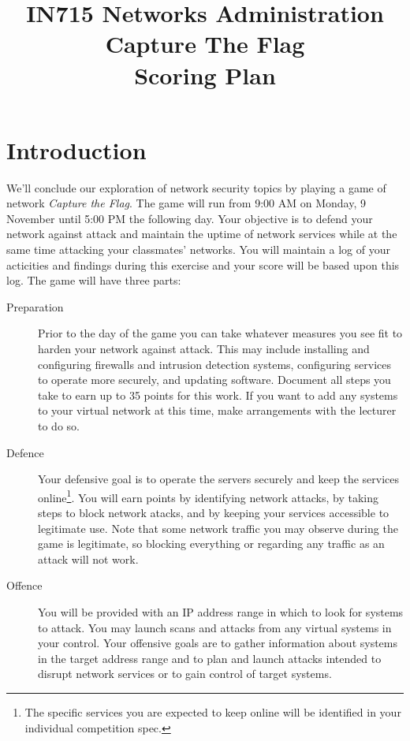 \documentclass{article}   	%
\title{IN715 Networks Administration\\Capture The Flag\\Scoring Plan}
\date{}							%
\begin{document}
\maketitle

\section*{Introduction}
We'll conclude our exploration of network security topics by playing a game of network \emph{Capture the Flag}. The game will run from 9:00 AM on Monday, 9 November until 5:00 PM the following day.  Your objective is to defend your network against attack and maintain the uptime of network services while at the same time attacking your classmates' networks.  You will maintain a log of your acticities and findings during this exercise and your score will be based upon this log. The game will have three parts:

\begin{description}
	\item [Preparation] Prior to the day of the game you can take whatever measures you see fit to harden your network against attack. This may include installing and configuring firewalls and intrusion detection systems, configuring services to operate more securely, and  updating software. Document all steps you take to earn up to 35 points for this work. If you want to add any systems to your virtual network at this time, make arrangements with the lecturer to do so.
  \item[Defence] Your defensive goal is to operate the servers securely and keep the services online\footnote{The specific services you are expected to keep online will be identified in your individual competition spec.}. You will earn points by identifying network attacks, by taking steps to block network atacks, and by keeping your services accessible to legitimate use.  Note that some network traffic you may observe during the game is legitimate, so blocking everything or regarding any traffic as an attack will not work.
  \item[Offence] You will be provided with an IP address range in which to look for systems to attack.  You may launch scans and attacks from any virtual systems in your control.  Your offensive goals are to gather information about systems in the target address range and to plan and launch attacks intended to disrupt network services or to gain control of target systems.  
\end{description}
\end{document}
